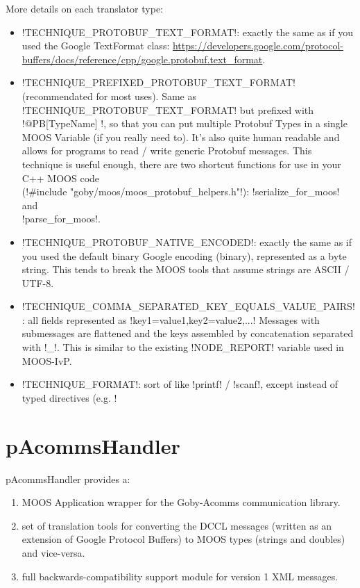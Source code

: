 More details on each translator type:
\begin{itemize}
\item !TECHNIQUE_PROTOBUF_TEXT_FORMAT!: exactly the same as if you used the Google TextFormat class: \url{https://developers.google.com/protocol-buffers/docs/reference/cpp/google.protobuf.text_format}.
\item !TECHNIQUE_PREFIXED_PROTOBUF_TEXT_FORMAT! (recommendated for most uses). Same as !TECHNIQUE_PROTOBUF_TEXT_FORMAT! but prefixed with !@PB[TypeName] !, so that you can put multiple Protobuf Types in a single MOOS Variable (if you really need to). It's also quite human readable and allows for programs to read / write generic Protobuf messages. This technique is useful enough, there are two shortcut functions for use in your C++ MOOS code\\(!#include "goby/moos/moos_protobuf_helpers.h"!): !serialize_for_moos! and \\!parse_for_moos!.
\item !TECHNIQUE_PROTOBUF_NATIVE_ENCODED!: exactly the same as if you used the default binary Google encoding (binary), represented as a byte string. This tends to break the MOOS tools that assume strings are ASCII / UTF-8. 
\item !TECHNIQUE_COMMA_SEPARATED_KEY_EQUALS_VALUE_PAIRS!: all fields represented as !key1=value1,key2=value2,...! Messages with submessages are flattened and the keys assembled by concatenation separated with !_!. This is similar to the existing !NODE_REPORT! variable used in MOOS-IvP.
\item !TECHNIQUE_FORMAT!: sort of like !printf! / !scanf!, except instead of typed directives (e.g. !%
\end{itemize}

\section{pAcommsHandler}
\label{sec:pacommshandler} 

pAcommsHandler provides a:
\begin{enumerate}
\item MOOS Application wrapper for the Goby-Acomms communication library.
\item set of translation tools for converting the DCCL messages (written as an extension of Google Protocol Buffers) to MOOS types (strings and doubles) and vice-versa.
\item full backwards-compatibility support module for version 1 XML messages. 
\end{enumerate}

